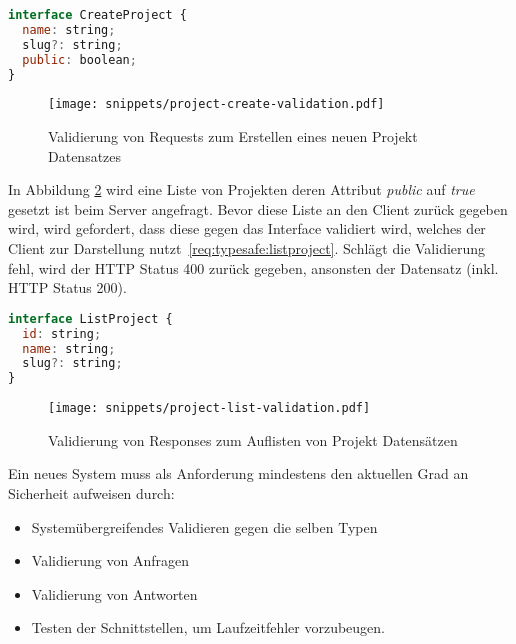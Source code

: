\begin{lstlisting}[language=Javascript,float=h!,caption={Interface zum Erstellen eines Projektes}, label={req:typesafe:createproject}]
interface CreateProject {
  name: string;
  slug?: string;
  public: boolean;
}
\end{lstlisting}

\begin{figure}[h!]
	\centering
	\texttt{[image: snippets/project-create-validation.pdf]}
	\caption{Validierung von Requests zum Erstellen eines neuen Projekt Datensatzes}
	\label{req:typesafe:request-validation}
\end{figure}

In Abbildung \ref{req:typesafe:list-validation} wird eine Liste von Projekten deren Attribut \emph{public} auf \emph{true} gesetzt ist beim Server angefragt. Bevor diese Liste an den Client zurück gegeben wird, wird gefordert, dass diese gegen das Interface validiert wird, welches der Client zur Darstellung nutzt~\ref{req:typesafe:listproject}. Schlägt die Validierung fehl, wird der HTTP Status 400 zurück gegeben, ansonsten der Datensatz (inkl. HTTP Status 200).

\begin{lstlisting}[language=Javascript,float=h!,caption={Interface zum Auflisten von Projekten}, label={req:typesafe:listproject}]
interface ListProject {
  id: string;
  name: string;
  slug?: string;
}
\end{lstlisting}

\begin{figure}[h!]
    \centering
    \texttt{[image: snippets/project-list-validation.pdf]}
    \caption{Validierung von Responses zum Auflisten von Projekt Datensätzen}
    \label{req:typesafe:list-validation}
\end{figure}

Ein neues System muss als Anforderung mindestens den aktuellen Grad an Sicherheit aufweisen durch:

\begin{itemize}
    \setlength\itemsep{-1em}
    \item Systemübergreifendes Validieren gegen die selben Typen
    \item Validierung von Anfragen
    \item Validierung von Antworten
    \item Testen der Schnittstellen, um Laufzeitfehler vorzubeugen.
\end{itemize}

